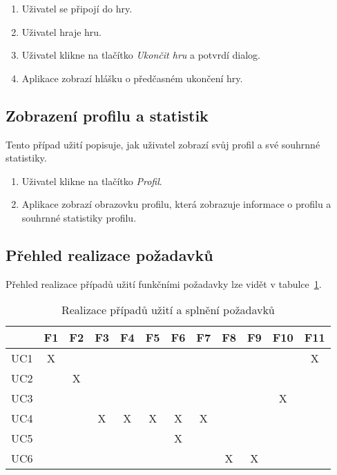 \begin{enumerate}
    \item Uživatel se připojí do hry.
    \item Uživatel hraje hru.
    \item Uživatel klikne na tlačítko \emph{Ukončit hru}
    a potvrdí dialog.
    \item Aplikace zobrazí hlášku o předčasném ukončení hry.
\end{enumerate}

\subsection{Zobrazení profilu a statistik}

Tento případ užití popisuje,
jak uživatel zobrazí svůj profil a své souhrnné statistiky.

\begin{enumerate}
    \item Uživatel klikne na tlačítko \emph{Profil}.
    \item Aplikace zobrazí obrazovku profilu,
    která zobrazuje informace o profilu a souhrnné statistiky profilu.
\end{enumerate}

\let\thesubsection=\oldsubsection

\subsection{Přehled realizace požadavků}

Přehled realizace případů užití funkčními požadavky lze vidět v
tabulce~\ref{tab:use-case-requirements}.

\begin{table}[h!]
    \centering
    \begin{tabular}{c||c|c|c|c|c|c|c|c|c|c|c} 
        & F1 & F2 & F3 & F4 & F5 & F6 & F7 & F8 & F9 & F10 & F11 \\\hline\hline
        UC1 & X &   &   &   &   &   &   &   &   &   & X \\\hline %
        UC2 &   & X &   &   &   &   &   &   &   &   &   \\\hline %
        UC3 &   &   &   &   &   &   &   &   &   & X &   \\\hline %
        UC4 &   &   & X & X & X & X & X &   &   &   &   \\\hline %
        UC5 &   &   &   &   &   & X &   &   &   &   &   \\\hline %
        UC6 &   &   &   &   &   &   &   & X & X &   &   \\ %
    \end{tabular}
    \caption{Realizace případů užití a splnění požadavků}
    \label{tab:use-case-requirements}
\end{table}
